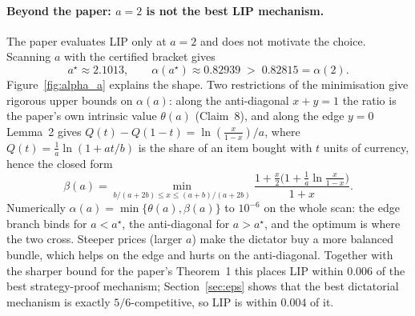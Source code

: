 \paragraph{Beyond the paper: $a=2$ is not the best LIP mechanism.} The paper evaluates LIP only
at $a=2$ and does not motivate the choice. Scanning $a$ with the certified bracket gives
\[
a^\star\approx2.1013,\qquad \alpha(a^\star)\approx0.82939\;>\;0.82815=\alpha(2).
\]
Figure~\ref{fig:alpha_a} explains the shape. Two restrictions of the minimisation give
rigorous upper bounds on $\alpha(a)$: along the anti-diagonal $x+y=1$ the ratio is the paper's
own intrinsic value $\theta(a)$ (Claim~8), and along the edge $y=0$ Lemma~2 gives
$Q(t)-Q(1-t)=\ln(\tfrac{x}{1-x})/a$, where $Q(t)=\tfrac1a\ln(1+at/b)$ is the share of an
item bought with $t$ units of currency, hence the closed form
\[
\beta(a)=\min_{b/(a+2b)\le x\le(a+b)/(a+2b)}\frac{1+\tfrac x2\big(1+\tfrac1a\ln\tfrac{x}{1-x}\big)}{1+x}.
\]
Numerically $\alpha(a)=\min\{\theta(a),\beta(a)\}$ to $10^{-6}$ on the whole scan: the edge
branch binds for $a<a^\star$, the anti-diagonal for $a>a^\star$, and the optimum is where the
two cross. Steeper prices (larger $a$) make the dictator buy a more balanced bundle, which helps
on the edge and hurts on the anti-diagonal. Together with the sharper bound for the paper's Theorem~1 this
places LIP within $0.006$ of the best strategy-proof mechanism; Section~\ref{sec:eps} shows that the
best dictatorial mechanism is exactly $5/6$-competitive, so LIP is within $0.004$ of it.


